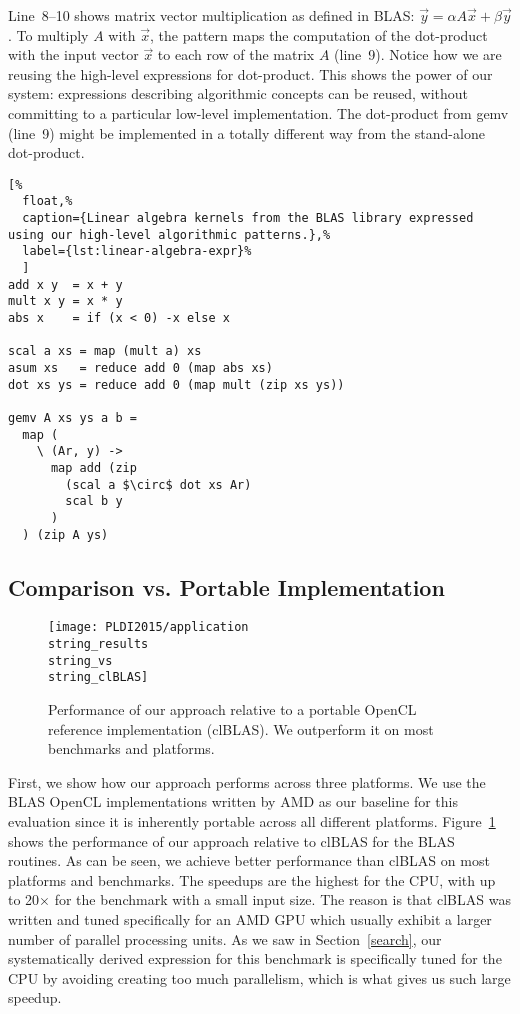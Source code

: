 Line~8--10 shows matrix vector multiplication as defined in BLAS: $\vec{y} = \alpha A \vec{x} + \beta \vec{y}$.
To multiply $A$ with $\vec{x}$, the  pattern maps the computation of the dot-product with the input vector $\vec{x}$ to each row of the matrix $A$ (line~9).
Notice how we are reusing the high-level expressions for dot-product. %
This shows the power of our system: expressions describing algorithmic concepts can be reused, without committing to a particular low-level implementation.
The dot-product from gemv (line~9) might be implemented in a totally different way from the stand-alone dot-product.

\begin{lstlisting}[%
  float,%
  caption={Linear algebra kernels from the BLAS library expressed using our high-level algorithmic patterns.},%
  label={lst:linear-algebra-expr}%
  ]
add x y  = x + y
mult x y = x * y
abs x    = if (x < 0) -x else x

scal a xs = map (mult a) xs
asum xs   = reduce add 0 (map abs xs)
dot xs ys = reduce add 0 (map mult (zip xs ys))

gemv A xs ys a b =
  map (
    \ (Ar, y) ->
      map add (zip
        (scal a $\circ$ dot xs Ar)
        scal b y
      )
  ) (zip A ys)
\end{lstlisting}


\subsection{Comparison vs. Portable Implementation}

\begin{figure}[t]
  \texttt{[image: PLDI2015/application\\string\_results\\string\_vs\\string\_clBLAS]}
  \caption{Performance of our approach relative to a portable OpenCL reference implementation (clBLAS).
           We outperform it on most benchmarks and platforms.}
  \label{fig:clblas}
\end{figure}

First, we show how our approach performs across three platforms.
We use the BLAS OpenCL implementations written by AMD as our baseline for this evaluation since it is inherently portable across all different platforms.
Figure~\ref{fig:clblas} shows the performance of our approach relative to clBLAS for the BLAS routines.
As can be seen, we achieve better performance than clBLAS on most platforms and benchmarks.
The speedups are the highest for the CPU, with up to 20$\times$ for the  benchmark with a small input size.
The reason is that clBLAS was written and tuned specifically for an AMD GPU which usually exhibit a larger number of parallel processing units.
As we saw in Section~\ref{search}, our systematically derived expression for this benchmark is specifically tuned for the CPU by avoiding creating too much parallelism, which is what gives us such large speedup.

